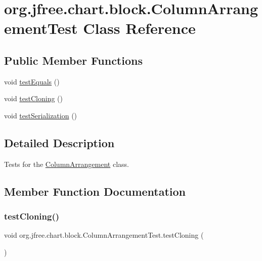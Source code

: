 \hypertarget{classorg_1_1jfree_1_1chart_1_1block_1_1_column_arrangement_test}{}\section{org.\+jfree.\+chart.\+block.\+Column\+Arrangement\+Test Class Reference}
\label{classorg_1_1jfree_1_1chart_1_1block_1_1_column_arrangement_test}
\subsection*{Public Member Functions}
\begin{DoxyCompactItemize}
\item 
void \mbox{\hyperlink{classorg_1_1jfree_1_1chart_1_1block_1_1_column_arrangement_test_abb623e556c07e88175d19113348f16af}{test\+Equals}} ()
\item 
void \mbox{\hyperlink{classorg_1_1jfree_1_1chart_1_1block_1_1_column_arrangement_test_a3c80fdc4185ad7e1e3cd4b2683a956f7}{test\+Cloning}} ()
\item 
void \mbox{\hyperlink{classorg_1_1jfree_1_1chart_1_1block_1_1_column_arrangement_test_a6f3d010568e97e68f4eb272525e3e55b}{test\+Serialization}} ()
\end{DoxyCompactItemize}


\subsection{Detailed Description}
Tests for the \mbox{\hyperlink{classorg_1_1jfree_1_1chart_1_1block_1_1_column_arrangement}{Column\+Arrangement}} class. 

\subsection{Member Function Documentation}
\mbox{\label{classorg_1_1jfree_1_1chart_1_1block_1_1_column_arrangement_test_a3c80fdc4185ad7e1e3cd4b2683a956f7}} 
\subsubsection{\texorpdfstring{test\+Cloning()}{testCloning()}}
{\footnotesize\ttfamily void org.\+jfree.\+chart.\+block.\+Column\+Arrangement\+Test.\+test\+Cloning (\begin{DoxyParamCaption}{ }\end{DoxyParamCaption})}

